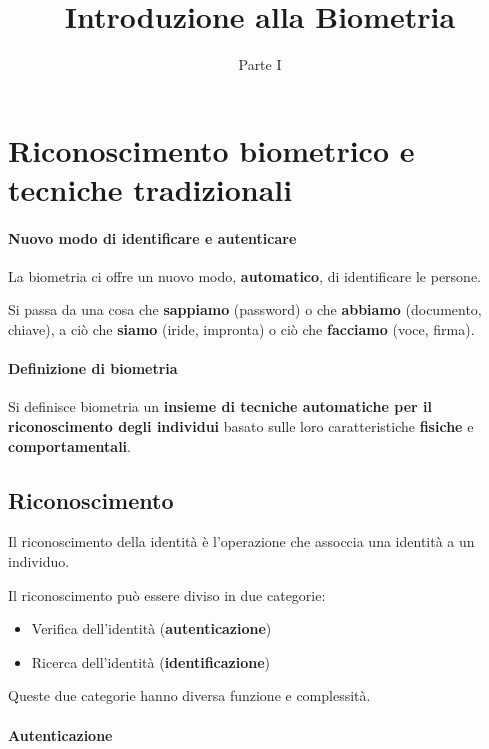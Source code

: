 \documentclass{report}
\title{Introduzione alla Biometria}
\date{Parte I}
\begin{document}
\maketitle

\tableofcontents

\chapter{Riconoscimento biometrico e tecniche tradizionali}


\subsubsection{Nuovo modo di identificare e autenticare}

La biometria ci offre un nuovo modo, \textbf{automatico}, di identificare le persone.

\noindent Si passa da una cosa che \textbf{sappiamo} (password) o che \textbf{abbiamo} (documento, chiave), a ciò che \textbf{siamo} (iride, impronta) o ciò che \textbf{facciamo} (voce, firma).

\subsubsection{Definizione di biometria}

Si definisce biometria un \textbf{insieme di tecniche automatiche per il riconoscimento degli individui} basato sulle loro caratteristiche \textbf{fisiche} e \textbf{comportamentali}.

\section{Riconoscimento}

Il riconoscimento della identità è l'operazione che assoccia una identità a un individuo.

Il riconoscimento può essere diviso in due categorie:
\begin{itemize}
    \item Verifica dell'identità (\textbf{autenticazione})
    \item Ricerca dell'identità (\textbf{identificazione})
\end{itemize}
Queste due categorie hanno diversa funzione e complessità.

\subsubsection{Autenticazione}
\end{document}
